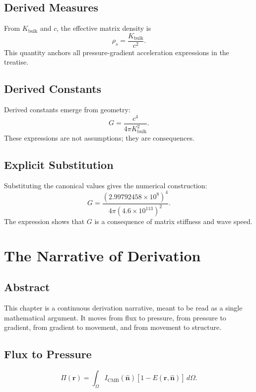 \documentclass[12pt]{book}
\begin{document}
\section{Derived Measures}
From $K_{\text{bulk}}$ and $c$, the effective matrix density is
\begin{equation}
\rho_s = \frac{K_{\text{bulk}}}{c^2}.
\end{equation}
This quantity anchors all pressure-gradient acceleration expressions in the treatise.

\section{Derived Constants}
Derived constants emerge from geometry:
\begin{equation}
G = \frac{c^4}{4\pi K_{\text{bulk}}^2}.
\end{equation}
These expressions are not assumptions; they are consequences.

\section{Explicit Substitution}
Substituting the canonical values gives the numerical construction:
\begin{equation}
G = \frac{(2.99792458 \times 10^8)^4}{4\pi (4.6 \times 10^{113})^2}.
\end{equation}
The expression shows that $G$ is a consequence of matrix stiffness and wave speed.

\chapter{The Narrative of Derivation}

\section*{Abstract}
This chapter is a continuous derivation narrative, meant to be read as a single mathematical argument.
It moves from flux to pressure, from pressure to gradient, from gradient to movement, and from movement
to structure.

\section{Flux to Pressure}
\begin{equation}
\Pi(\mathbf{r}) = \int_{\Omega} I_{\text{CMB}}(\hat{\mathbf{n}})\left[1 - E(\mathbf{r},\hat{\mathbf{n}})\right]\, d\Omega.
\end{equation}
\end{document}
